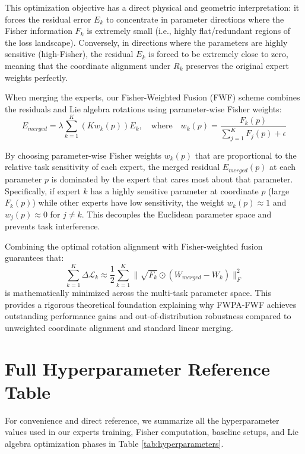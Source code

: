 \documentclass{article}
\theoremstyle{plain}
\theoremstyle{definition}
\theoremstyle{remark}
\begin{document}
This optimization objective has a direct physical and geometric interpretation: it forces the residual error $E_k$ to concentrate in parameter directions where the Fisher information $F_k$ is extremely small (i.e., highly flat/redundant regions of the loss landscape). Conversely, in directions where the parameters are highly sensitive (high-Fisher), the residual $E_k$ is forced to be extremely close to zero, meaning that the coordinate alignment under $R_k$ preserves the original expert weights perfectly.

When merging the experts, our Fisher-Weighted Fusion (FWF) scheme combines the residuals and Lie algebra rotations using parameter-wise Fisher weights:
\begin{equation}
    E_{merged} = \lambda \sum_{k=1}^K \left( K w_k(p) \right) E_k, \quad \text{where} \quad w_k(p) = \frac{F_k(p)}{\sum_{j=1}^K F_j(p) + \epsilon}
\end{equation}

By choosing parameter-wise Fisher weights $w_k(p)$ that are proportional to the relative task sensitivity of each expert, the merged residual $E_{merged}(p)$ at each parameter $p$ is dominated by the expert that cares most about that parameter. Specifically, if expert $k$ has a highly sensitive parameter at coordinate $p$ (large $F_k(p)$) while other experts have low sensitivity, the weight $w_k(p) \approx 1$ and $w_j(p) \approx 0$ for $j \neq k$. This decouples the Euclidean parameter space and prevents task interference.

Combining the optimal rotation alignment with Fisher-weighted fusion guarantees that:
\begin{equation}
    \sum_{k=1}^K \Delta \mathcal{L}_k \approx \frac{1}{2} \sum_{k=1}^K \| \sqrt{F_k} \odot (W_{merged} - W_k) \|_F^2
\end{equation}
is mathematically minimized across the multi-task parameter space. This provides a rigorous theoretical foundation explaining why FWPA-FWF achieves outstanding performance gains and out-of-distribution robustness compared to unweighted coordinate alignment and standard linear merging.

\section{Full Hyperparameter Reference Table}
\label{app:table}

For convenience and direct reference, we summarize all the hyperparameter values used in our experts training, Fisher computation, baseline setups, and Lie algebra optimization phases in Table \ref{tab:hyperparameters}.
\end{document}
